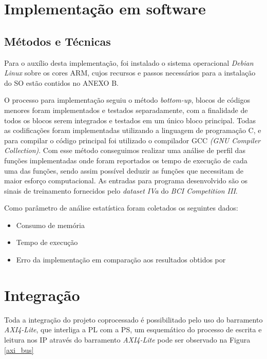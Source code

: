 \section{Implementação em software}

\subsection{Métodos e Técnicas}
Para o auxílio desta implementação, foi instalado o sistema operacional \textit{Debian Linux} sobre os cores ARM, cujos recursos e passos necessários
para a instalação do SO estão contidos no ANEXO B.

O processo para implementação seguiu o método \textit{bottom-up}, blocos de códigos menores foram implementados e testados separadamente, com a finalidade de todos os blocos serem integrados e testados em um único bloco principal. Todas as codificações foram implementadas utilizando a linguagem de programação C, e para compilar o código principal foi utilizado o compilador GCC \textit{(GNU Compiler Collection)}. Com esse método conseguimos realizar uma análise de perfil das funções implementadas onde foram reportados os tempo de execução de cada uma das funções, sendo assim possível deduzir as funções que necessitam de maior esforço computacional. As entradas para programa desenvolvido são os sinais de treinamento fornecidos pelo \textit{dataset IVa} do \textit{BCI Competition III}.

Como parâmetro de análise estatística foram coletados os seguintes dados:

\begin{itemize}[noitemsep]
\item Consumo de memória
\item Tempo de execução
\item Erro da implementação em comparação aos resultados obtidos por \cite{F.Lotte}
\end{itemize}

\section{Integração}
Toda a integração do projeto coprocessado é possibilitado pelo uso do barramento \textit{AXI4-Lite}, que interliga a PL com a PS, 
um esquemático do processo de escrita e leitura nos IP através do barramento \textit{AXI4-Lite} pode ser observado na Figura \ref{axi_bus}
\newpage

